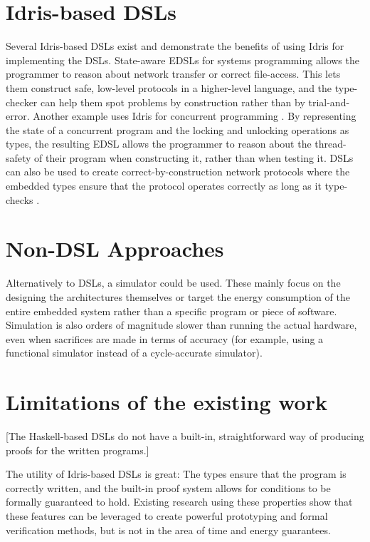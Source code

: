 \section{Idris-based DSLs}
	Several Idris-based DSLs exist and demonstrate the benefits of using Idris for implementing the DSLs. State-aware EDSLs for systems programming \cite{10.1007/978-3-642-27694-1_18} allows the programmer to reason about network transfer or correct file-access. This lets them construct safe, low-level protocols in a higher-level language, and the type-checker can help them spot problems by construction \cite{10.1007/978-3-642-27694-1_18} rather than by trial-and-error.
	Another example uses Idris for concurrent programming \cite{brady2010correct}. By representing the state of a concurrent program and the locking and unlocking operations as types, the resulting EDSL allows the programmer to reason about the thread-safety of their program when constructing it, rather than when testing it.
	DSLs can also be used to create correct-by-construction network protocols where the embedded types ensure that the protocol operates correctly as long as it type-checks \cite{5158855}.

\section{Non-DSL Approaches}
	Alternatively to DSLs, a simulator could be used. These mainly focus on the designing the architectures themselves \cite{10.1007/3-540-46002-0_32,Lee:2008:FFC:1375657.1375670} or target the energy consumption of the entire embedded system \cite{782199} rather than a specific program or piece of software. Simulation is also orders of magnitude slower than running the actual hardware, even when sacrifices are made in terms of accuracy (for example, using a functional simulator instead of a cycle-accurate simulator).

\section{Limitations of the existing work}
	[The Haskell-based DSLs do not have a built-in, straightforward way of producing proofs for the written programs.]
	
	The utility of Idris-based DSLs is great: The types ensure that the program is correctly written, and the built-in proof system allows for conditions to be formally guaranteed to hold. Existing research using these properties \cite{5158855,brady2010correct,10.1007/978-3-642-27694-1_18} show that these features can be leveraged to create powerful prototyping and formal verification methods, but is not in the area of time and energy guarantees.
